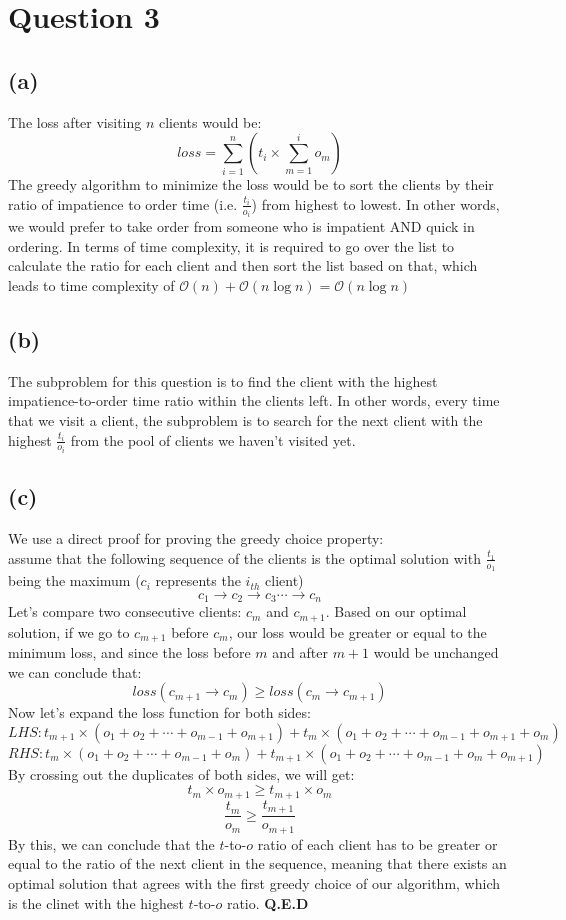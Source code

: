 
\section{Question 3}
    \subsection{(a)}
    The loss after visiting $n$ clients would be:
    \[ loss=\sum_{i=1}^{n}{(t_i \times \sum_{m=1}^{i}{o_m})} \]
    The greedy algorithm to minimize the loss would be to sort the clients by their ratio of impatience to order time
    (i.e. $\frac{t_i}{o_i}$) from highest to lowest. In other words, we would prefer to take order from someone who is
    impatient AND quick in ordering. In terms of time complexity, it is required to go over the list to calculate the
    ratio for each client and then sort the list based on that, which leads to time complexity of $\mathcal{O}(n)+
    \mathcal{O}(n\log{n})=\mathcal{O}(n\log{n})$
    \subsection{(b)}
    The subproblem for this question is to find the client with the highest impatience-to-order time ratio within the
    clients left. In other words, every time that we visit a client, the subproblem is to search for the next client
    with the highest $\frac{t_i}{o_i}$ from the pool of clients we haven't visited yet.
    \subsection{(c)}
    We use a direct proof for proving the greedy choice property:
    \\ assume that the following sequence of the clients is the optimal solution with $\frac{t_1}{o_1}$ being the maximum
    ($c_i$ represents the $i_{th}$ client)
    \[ c_1 \rightarrow c_2 \rightarrow c_3 \cdots \rightarrow c_n \] 
    Let's compare two consecutive clients: $c_m$ and $c_{m+1}$. Based on our optimal solution, if we go to $c_{m+1}$ before
    $c_m$, our loss would be greater or equal to the minimum loss, and since the loss before $m$ and after $m+1$ would be unchanged
    we can conclude that:
    \[ loss(c_{m+1} \rightarrow c_m) \geq loss(c_m \rightarrow c_{m+1}) \] 
    Now let's expand the loss function for both sides:
    \[ LHS: t_{m+1}\times(o_1+o_2+\cdots+o_{m-1}+o_{m+1})+t_{m}\times(o_1+o_2+\cdots+o_{m-1}+o_{m+1}+o_m) \]
    \[ RHS: t_{m}\times(o_1+o_2+\cdots+o_{m-1}+o_{m})+t_{m+1}\times(o_1+o_2+\cdots+o_{m-1}+o_{m}+o_{m+1}) \]
    By crossing out the duplicates of both sides, we will get:
    \[ t_{m} \times o_{m+1} \geq t_{m+1} \times o_{m} \]
    \[ \frac{t_m}{o_m} \geq \frac{t_{m+1}}{o_{m+1}} \]
    By this, we can conclude that the $t$-to-$o$ ratio of each client has to be greater or equal to the ratio of the next client in the
    sequence, meaning that there exists an optimal solution that agrees with the first greedy choice of our algorithm, which is the clinet with
    the highest $t$-to-$o$ ratio. \textbf{Q.E.D}
